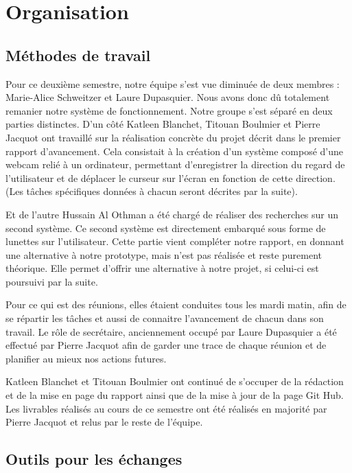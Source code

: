 \chapter{Organisation}

\section{Méthodes de travail}

Pour ce deuxième semestre, notre équipe s’est vue diminuée de deux membres : Marie-Alice Schweitzer et Laure Dupasquier. Nous avons donc dû totalement remanier notre système de fonctionnement.
Notre groupe s'est séparé en deux parties distinctes. D’un côté Katleen Blanchet, Titouan Boulmier et Pierre Jacquot ont travaillé sur la réalisation concrète du projet décrit dans le premier rapport d’avancement. Cela consistait à la création d’un système composé d’une webcam relié à un ordinateur, permettant d’enregistrer la direction du regard de l’utilisateur et de déplacer le curseur sur l’écran en fonction de cette direction.  (Les tâches spécifiques données à chacun seront décrites par la suite).

Et de l’autre Hussain Al Othman a été chargé de réaliser des recherches sur un second système. Ce second système est directement embarqué sous forme de lunettes sur l’utilisateur. Cette partie vient compléter notre rapport, en donnant une alternative à notre prototype, mais n'est pas réalisée et reste purement théorique. Elle permet d’offrir une alternative à notre projet, si celui-ci est poursuivi par la suite.

Pour ce qui est des réunions, elles étaient conduites tous les mardi matin, afin de se répartir les tâches et aussi de connaitre l’avancement de chacun dans son travail. Le rôle de secrétaire, anciennement occupé par Laure Dupasquier a été effectué par Pierre Jacquot afin de garder une trace de chaque réunion et de planifier au mieux nos actions futures.

Katleen Blanchet et Titouan Boulmier ont continué de s’occuper de la rédaction et de la mise en page du rapport ainsi que de la mise à jour de la page Git Hub.
Les livrables réalisés au cours de ce semestre ont été réalisés en majorité par Pierre Jacquot et relus par le reste de l’équipe.

\section{Outils pour les échanges}

